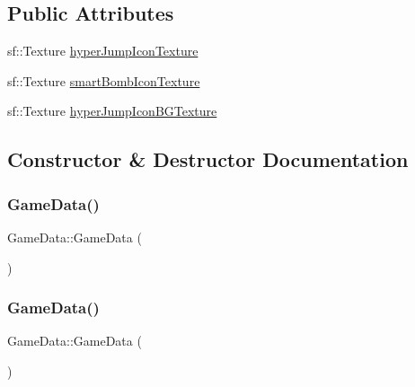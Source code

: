 \subsection*{Public Attributes}
\begin{DoxyCompactItemize}
\item 
sf\+::\+Texture \hyperlink{class_game_data_a907cebe774432c3c7ad13d803d3c62e9}{hyper\+Jump\+Icon\+Texture}
\item 
sf\+::\+Texture \hyperlink{class_game_data_ac63214113f28ecb54f58a7135cc85cc6}{smart\+Bomb\+Icon\+Texture}
\item 
sf\+::\+Texture \hyperlink{class_game_data_a2ddb16001fc14e2da91d56cd5c1b9dbd}{hyper\+Jump\+Icon\+B\+G\+Texture}
\end{DoxyCompactItemize}


\subsection{Constructor \& Destructor Documentation}
\mbox{\label{class_game_data_a0361292205caafffd2810013c2fef134}} 
\subsubsection{\texorpdfstring{Game\+Data()}{GameData()}\hspace{0.1cm}{\footnotesize\ttfamily [1/2]}}
{\footnotesize\ttfamily Game\+Data\+::\+Game\+Data (\begin{DoxyParamCaption}\item[{\hyperlink{class_game_data}{Game\+Data} const \&}]{ }\end{DoxyParamCaption})\hspace{0.3cm}{\ttfamily [delete]}}

\mbox{\label{class_game_data_af4225d69d56095e6d1a6d3bdeba8602f}} 
\subsubsection{\texorpdfstring{Game\+Data()}{GameData()}\hspace{0.1cm}{\footnotesize\ttfamily [2/2]}}
{\footnotesize\ttfamily Game\+Data\+::\+Game\+Data (\begin{DoxyParamCaption}\item[{\hyperlink{class_game_data}{Game\+Data} \&\&}]{ }\end{DoxyParamCaption})\hspace{0.3cm}{\ttfamily [delete]}}



